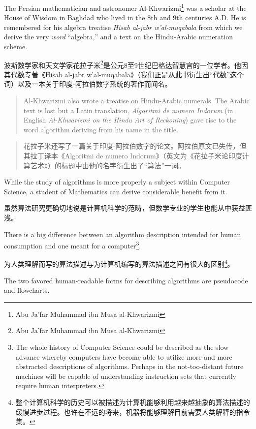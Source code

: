 The Persian mathematician and astronomer
Al-Khwarizmi\footnote{Abu Ja'far Muhammad ibn Musa al-Khwarizmi} was a
scholar at the House of Wisdom in Baghdad who lived in the 8th and 9th
centuries A.D.   He is remembered for his algebra treatise \emph{Hisab
  al-jabr w'al-muqabala} from which we derive the very {\em word}
``algebra,'' and a text on the Hindu-Arabic numeration scheme.

波斯数学家和天文学家花拉子米\footnote{Abu Ja'far Muhammad ibn Musa al-Khwarizmi}是公元8至9世纪巴格达智慧宫的一位学者。他因其代数专著《Hisab al-jabr w'al-muqabala》（我们正是从此书衍生出“代数”这个词）以及一本关于印度-阿拉伯数字系统的著作而闻名。

\begin{quote}
Al-Khwarizmi also wrote a treatise on Hindu-Arabic numerals.  The
Arabic text is lost but a Latin translation, {\em Algoritmi de numero
Indorum} (in English {\em Al-Khwarizmi on the Hindu Art of Reckoning}) gave
rise to the word algorithm deriving from his name in the
title.~\cite{HisMathArch} 
\end{quote}

\begin{quote}
花拉子米还写了一篇关于印度-阿拉伯数字的论文。阿拉伯原文已失传，但其拉丁译本《Algoritmi de numero Indorum》（英文为《花拉子米论印度计算艺术》）的标题中由他的名字衍生出了“算法”一词。~\cite{HisMathArch}
\end{quote}

While the study of algorithms is more properly a subject within
Computer Science, a student of Mathematics can derive considerable
benefit from it.

虽然算法研究更确切地说是计算机科学的范畴，但数学专业的学生也能从中获益匪浅。

There is a big difference between an algorithm description intended
for human consumption and one meant for a computer\footnote{The 
whole history of Computer Science could be
  described as the slow advance whereby computers have become  able to
  utilize more and more abstracted descriptions of algorithms.
Perhaps in the not-too-distant future machines will be capable of
  understanding instruction sets that currently require human interpreters.}.

为人类理解而写的算法描述与为计算机编写的算法描述之间有很大的区别\footnote{整个计算机科学的历史可以被描述为计算机能够利用越来越抽象的算法描述的缓慢进步过程。也许在不远的将来，机器将能够理解目前需要人类解释的指令集。}。

The two favored human-readable forms for describing
algorithms are  pseudocode and  
flowcharts.

